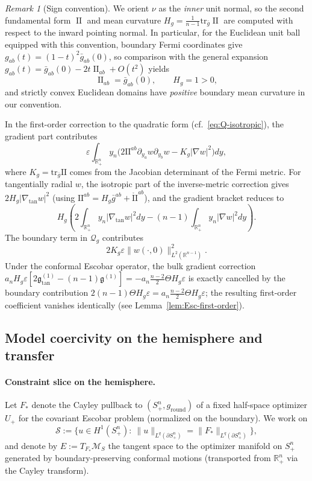 \documentclass[11pt,reqno,a4paper]{amsart}
\newcommand{\R}{\mathbb{R}}
\DeclareMathOperator{\II}{II}
\numberwithin{equation}{section}
\theoremstyle{plain}
\theoremstyle{remark}
\newtheorem{remark}[theorem]{Remark}
\theoremstyle{plain}
\begin{document}
\begin{remark}[Sign convention]\label{rem:sign-sanity}
We orient $\nu$ as the \emph{inner} unit normal, so the second fundamental form $\II$ and
mean curvature $H_g=\frac{1}{n-1}\mathrm{tr}_{\bar g}\II$ are computed with respect to the inward
pointing normal. In particular, for the Euclidean unit ball equipped with this convention,
boundary Fermi coordinates give $g_{ab}(t)=(1-t)^2\bar g_{ab}(0)$, so comparison with the
general expansion $g_{ab}(t)=\bar g_{ab}(0)-2t\II_{ab}+O(t^2)$ yields
\[
\II_{ab}=\bar g_{ab}(0),\qquad H_g=1>0,
\]
and strictly convex Euclidean domains have \emph{positive} boundary mean curvature in our
convention.

In the first-order correction to the quadratic form (cf.\ \eqref{eq:Q-isotropic}), the
gradient part contributes
\[
\varepsilon\int_{\R^n_+} y_n\Big(2\mathrm{II}^{ab}\partial_{y_a} w\partial_{y_b} w
- K_g|\nabla w|^2\Big)dy,
\]
where $K_g=\mathrm{tr}_{\bar g}\mathrm{II}$ comes from the Jacobian
determinant of the Fermi metric.
For tangentially radial $w$, the isotropic part of the inverse-metric correction
gives $2H_g|\nabla_{\mathrm{tan}}w|^2$ (using $\mathrm{II}^{ab}=H_g\bar g^{ab}+\mathring{\mathrm{II}}^{ab}$),
and the gradient bracket reduces to
\[
H_g\left(2\int_{\R^n_+} y_n|\nabla_{\tan}w|^2dy
- (n-1)\int_{\R^n_+} y_n|\nabla w|^2dy\right).
\]
The boundary term in $\mathcal Q_g$ contributes
\[
2K_g\varepsilon\|w(\cdot,0)\|_{L^2(\R^{n-1})}^2.
\]
Under the conformal Escobar operator, the bulk gradient correction
$a_nH_g\varepsilon[2\mathfrak g_{\tan}^{(1)}-(n-1)\mathfrak g^{(1)}]
=-a_n\frac{n-2}{2}\Theta H_g\varepsilon$
is exactly cancelled by the boundary contribution
$2(n-1)\Theta H_g\varepsilon = a_n\frac{n-2}{2}\Theta H_g\varepsilon$;
the resulting first-order coefficient vanishes identically
(see Lemma~\ref{lem:Esc-first-order}).
\end{remark}


\subsection{Model coercivity on the hemisphere and transfer}


\paragraph{Constraint slice on the hemisphere.}
Let $F_\ast$ denote the Cayley pullback to $(S^n_+,g_{\mathrm{round}})$ of a fixed half-space optimizer $U_+$ for the covariant Escobar problem (normalized on the boundary). We work on
\begin{equation}\label{eq:Esc-constraint-slice}
  \mathcal S:=\Big\{u\in H^1(S^n_+):\ \|u\|_{L^q(\partial S^n_+)}=\|F_\ast\|_{L^q(\partial S^n_+)}\Big\},
\end{equation}
and denote by $E:=T_{F_\ast}\mathcal M_S$ the tangent space to the optimizer manifold on $S^n_+$ generated by boundary-preserving conformal motions (transported from $\R^n_+$ via the Cayley transform).
\end{document}

